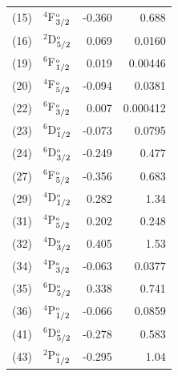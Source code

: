 \documentclass[10pt,a4paper, twoside, openright]{report}
\begin{document}
\begin{table}[t!]
\begin{tabular}{cl@{\hspace{0.75cm}}r@{\hspace{0.75cm}}r@{\hspace{0.75cm}}}
 (15) &$^4$F$^{\rm_o}_{3/2}$  & -0.360   & 0.688   \\
 (16) &$^2$D$^{\rm_o}_{5/2}$    & 0.069   & 0.0160   \\
 (19) &$^6$F$^{\rm_o}_{1/2}$   &   0.019   & 0.00446  \\
 (20) &$^4$F$^{\rm_o}_{5/2}$   &  -0.094   & 0.0381  \\
 (22) &$^6$F$^{\rm_o}_{3/2}$  & 0.007   & 0.000412  \\
 (23) &$^6$D$^{\rm_o}_{1/2}$    & -0.073   & 0.0795 \\
 (24) &$^6$D$^{\rm_o}_{3/2}$ & -0.249   & 0.477 \\
 (27) &$^6$F$^{\rm_o}_{5/2}$   & -0.356   & 0.683   \\
 (29) &$^4$D$^{\rm_o}_{1/2}$   &  0.282   & 1.34 \\
 (31) &$^4$P$^{\rm_o}_{5/2}$ & 0.202   & 0.248 \\
 (32) &$^4$D$^{\rm_o}_{3/2}$   & 0.405   & 1.53    \\
 (34) &$^4$P$^{\rm_o}_{3/2}$   &  -0.063   & 0.0377 \\
 (35) &$^6$D$^{\rm_o}_{5/2}$  & 0.338   & 0.741   \\
 (36) &$^4$P$^{\rm_o}_{1/2}$    & -0.066   & 0.0859  \\
 (41) &$^6$D$^{\rm_o}_{5/2}$  & -0.278   & 0.583  \\
 (43) & $^2$P$^{\rm_o}_{1/2}$  &  -0.295   & 1.04  \\
\bottomrule
\bottomrule
\end{tabular}
\end{table}
\end{document}
